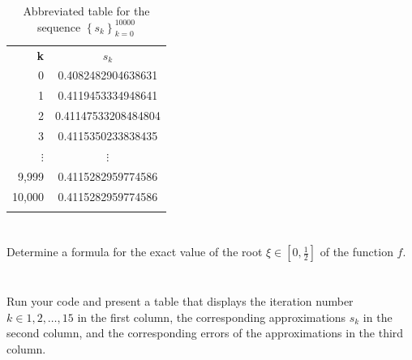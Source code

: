\documentclass{article}
\begin{document}
\begin{table}[H]
    \centering
    \begin{tabular}{|r|c|}
        \Xhline{1 pt}
         \textbf{k}& \textbf{$s_k$}  \\
         \Xhline{1.5 pt}
         0 & 0.4082482904638631\\
         \Xhline{1 pt}
         1 & 0.4119453334948641\\
         \Xhline{1 pt}
         2 & 0.41147533208484804\\
         \Xhline{1 pt}
         3 & 0.4115350233838435\\
         \Xhline{1 pt}
         $\vdots$ & $\vdots$\\
          \Xhline{1 pt}
         9,999 & 0.4115282959774586\\
          \Xhline{1 pt}
         10,000 & 0.4115282959774586\\
         \Xhline{1 pt}
    \end{tabular}
    \caption{Abbreviated table for the sequence $\left\{ s_k\right\}_{k=0}^{10000}$}
    \label{tab:10sequence}
\end{table}


\section{}
Determine a formula for the exact value of the root $\xi \in \left[0,\frac{1}{2} \right]$ of the function $f$.
\vspace{10mm}


\section{}
Run your code and present a table that displays the iteration number $k \in {1,2,\dots,15}$ in the first column, the corresponding approximations $s_k$ in the second column, and the corresponding errors of the approximations in the third column.
\vspace{10mm}
\end{document}
